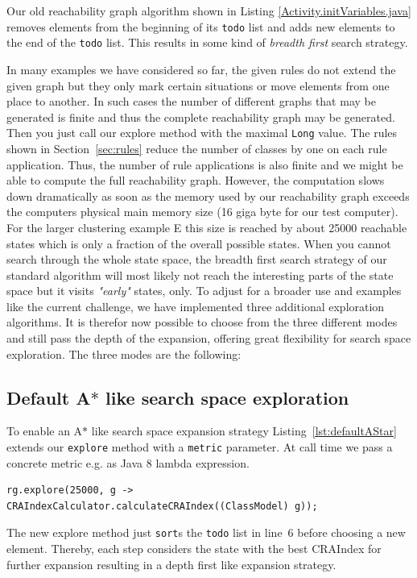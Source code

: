\documentclass[submission,copyright,creativecommons]{eptcs}
\begin{document}
Our old reachability graph algorithm shown in Listing \ref{Activity.initVariables.java}
removes elements from the beginning of its \texttt{todo} list and adds new elements to the 
end of the \texttt{todo} list. This results in some kind of \emph{breadth first} 
search strategy. 

In many examples we have considered so far, the given rules 
do not extend the given graph but they only mark certain situations or move elements 
from one place to another. In such cases the number of different graphs that 
may be generated is finite and thus the complete reachability graph may be 
generated. Then you just call our explore method with the maximal \texttt{Long} value. 
The rules shown in Section~\ref{sec:rules} reduce the number of classes by one on each 
rule application. Thus, the number of rule applications is also finite and we 
might be able to compute the full reachability graph. However, the computation 
slows down dramatically as soon as the memory used by our reachability graph exceeds 
the computers physical main memory size (16 giga byte for our test computer). For the 
larger clustering example E this size is reached by about 25000 reachable states
which is only a fraction of the overall possible states. 
When you cannot search through the whole state space, the breadth first search 
strategy of our standard algorithm will most likely not reach the interesting 
parts of the state space but it visits \emph{"early"} states, only.   
To adjust for a broader use and examples like the current challenge, 
we have implemented three additional exploration algorithms. It is therefor now 
possible to choose from the three different modes and still pass the depth of 
the expansion, offering great flexibility for search space exploration. The 
three modes are the following:


\subsection{Default A$*$ like search space exploration}

To enable an A$*$ like search space expansion strategy Listing~\ref{lst:defaultAStar}
extends our \texttt{explore} method with a \texttt{metric} parameter. At call time
we pass a concrete metric e.g. as Java 8 lambda expression. 
\begin{verbatim}
rg.explore(25000, g -> CRAIndexCalculator.calculateCRAIndex((ClassModel) g));
\end{verbatim}
The new explore method just \texttt{sort}s the \texttt{todo} list in line~6 before choosing 
a new element. Thereby, each step considers the state with the best 
CRAIndex for further expansion resulting in a depth first like expansion strategy. 
\end{document}

